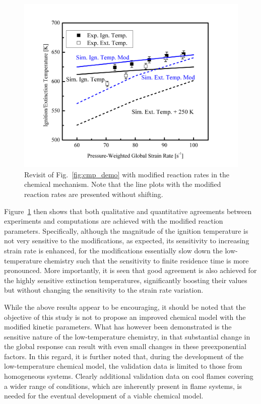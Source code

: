 \begin{figure}[t]
  \centering
  \scriptsize
  \includegraphics[width=1.0\textwidth]{ch-NTC/cmp_demo_mod.png}
  \normalsize
  \caption{Revisit of Fig.~\ref{fig:cmp_demo} with modified reaction rates in the chemical mechanism.  Note that the line plots with the modified reaction rates are presented without shifting.}
  \label{fig:cmp_demo_mod}
\end{figure}

Figure~\ref{fig:cmp_demo_mod} then shows that both qualitative and quantitative agreements between experiments and computations are achieved with the modified reaction parameters.  Specifically, although the magnitude of the ignition temperature is not very sensitive to the modifications, as expected, its sensitivity to increasing strain rate is enhanced, for the modifications essentially slow down the low-temperature chemistry such that the sensitivity to finite residence time is more pronounced.  More importantly, it is seen that good agreement is also achieved for the highly sensitive extinction temperatures, significantly boosting their values but without changing the sensitivity to the strain rate variation.

While the above results appear to be encouraging, it should be noted that the objective of this study is not to propose an improved chemical model with the modified kinetic parameters.  What has however been demonstrated is the sensitive nature of the low-temperature chemistry, in that substantial change in the global response can result with even small changes in these preexponential factors. In this regard, it is further noted that, during the development of the low-temperature chemical model, the validation data is limited to those from homogeneous systems. Clearly additional validation data on cool flames covering a wider range of conditions, which are inherently present in flame systems, is needed for the eventual development of a viable chemical model.

